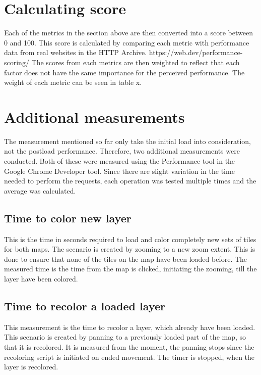 \section{Calculating score}\label{ScoreCal}

Each of the metrics in the section above are then converted into a score between 0 and 100. This score is calculated by comparing each metric with performance data from real websites in the HTTP Archive.
https://web.dev/performance-scoring/
The scores from each metrics are then weighted to reflect that each factor does not have the same importance for the perceived performance. The weight of each metric can be seen in table x.


\section{Additional measurements}

The measurement mentioned so far only take the initial load into consideration, not the postload performance. 
Therefore, two additional measurements were conducted. Both of these were measured using the Performance tool in the Google Chrome Developer tool. Since there are slight variation in the time needed to perform the requests, each operation was tested multiple times and the average was calculated. 
\subsection{Time to color new layer}
This is the time in seconds required to load and color completely new sets of tiles for both maps. The scenario is created by zooming to a new zoom extent. This is done to ensure that none of the tiles on the map have been loaded before. The measured time is the time from the map is clicked, initiating the zooming, till the layer have been colored.

\subsection{Time to recolor a loaded layer}
This measurement is the time to recolor a layer, which already have been loaded. This scenario is created by panning to a previously loaded part of the map, so that it is recolored. 
It is measured from the moment, the panning stops since the recoloring script is initiated on ended movement. The timer is stopped, when the layer is recolored.

